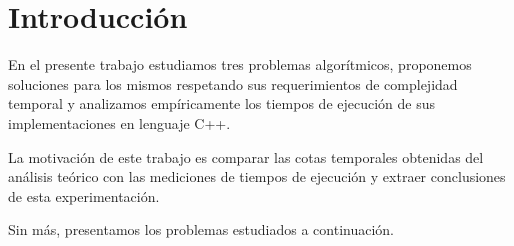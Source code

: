 \documentclass[a4paper, 10pt, twoside]{article}
\begin{document}
\newpage




\tableofcontents

\newpage




\section{Introducción}

En el presente trabajo estudiamos tres problemas algorítmicos, proponemos soluciones para los mismos respetando sus requerimientos de complejidad temporal y analizamos empíricamente los tiempos de ejecución de sus implementaciones en lenguaje C++.

La motivación de este trabajo es comparar las cotas temporales obtenidas del análisis teórico con las mediciones de tiempos de ejecución y extraer conclusiones de esta experimentación.

Sin más, presentamos los problemas estudiados a continuación.




\newpage
\end{document}
